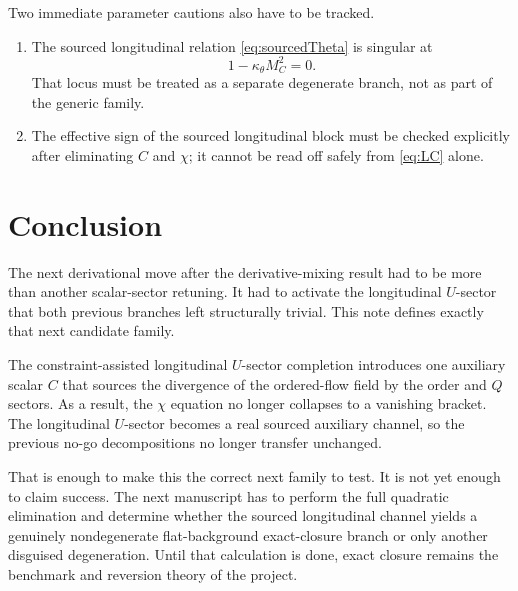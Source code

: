 \documentclass[11pt]{article}
\begin{document}
Two immediate parameter cautions also have to be tracked.
\begin{enumerate}
    \item The sourced longitudinal relation \eqref{eq:sourcedTheta} is singular at
    \begin{equation}
    1-\kappa_\theta M_C^2=0.
    \label{eq:singular}
    \end{equation}
    That locus must be treated as a separate degenerate branch, not as part of the generic family.
    \item The effective sign of the sourced longitudinal block must be checked explicitly after eliminating \(C\) and \(\chi\); it cannot be read off safely from \eqref{eq:LC} alone.
\end{enumerate}

\section{Conclusion}

The next derivational move after the derivative-mixing result had to be more than another scalar-sector retuning. It had to activate the longitudinal \(U\)-sector that both previous branches left structurally trivial. This note defines exactly that next candidate family.

The constraint-assisted longitudinal \(U\)-sector completion introduces one auxiliary scalar \(C\) that sources the divergence of the ordered-flow field by the order and \(Q\) sectors. As a result, the \(\chi\) equation no longer collapses to a vanishing bracket. The longitudinal \(U\)-sector becomes a real sourced auxiliary channel, so the previous no-go decompositions no longer transfer unchanged.

That is enough to make this the correct next family to test. It is not yet enough to claim success. The next manuscript has to perform the full quadratic elimination and determine whether the sourced longitudinal channel yields a genuinely nondegenerate flat-background exact-closure branch or only another disguised degeneration. Until that calculation is done, exact closure remains the benchmark and reversion theory of the project.
\end{document}
